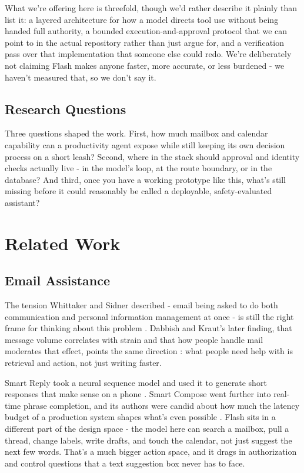 \documentclass[conference]{IEEEtran}
\begin{document}
What we're offering here is threefold, though we'd rather describe it plainly than list it: a layered architecture for how a model directs tool use without being handed full authority, a bounded execution-and-approval protocol that we can point to in the actual repository rather than just argue for, and a verification pass over that implementation that someone else could redo. We're deliberately not claiming Flash makes anyone faster, more accurate, or less burdened - we haven't measured that, so we don't say it.

\subsection{Research Questions}

Three questions shaped the work. First, how much mailbox and calendar capability can a productivity agent expose while still keeping its own decision process on a short leash? Second, where in the stack should approval and identity checks actually live - in the model's loop, at the route boundary, or in the database? And third, once you have a working prototype like this, what's still missing before it could reasonably be called a deployable, safety-evaluated assistant?

\section{Related Work}

\subsection{Email Assistance}

The tension Whittaker and Sidner described - email being asked to do both communication and personal information management at once - is still the right frame for thinking about this problem \cite{whittaker1996}. Dabbish and Kraut's later finding, that message volume correlates with strain and that how people handle mail moderates that effect, points the same direction \cite{dabbish2006}: what people need help with is retrieval and action, not just writing faster.

Smart Reply took a neural sequence model and used it to generate short responses that make sense on a phone \cite{kannan2016}. Smart Compose went further into real-time phrase completion, and its authors were candid about how much the latency budget of a production system shapes what's even possible \cite{chen2019}. Flash sits in a different part of the design space - the model here can search a mailbox, pull a thread, change labels, write drafts, and touch the calendar, not just suggest the next few words. That's a much bigger action space, and it drags in authorization and control questions that a text suggestion box never has to face.
\end{document}
